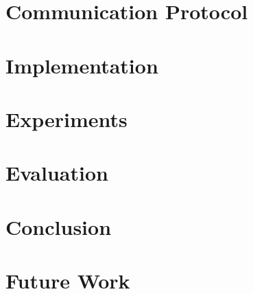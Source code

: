 \documentclass[
	paper=a4,
	fontsize=11pt,
	parskip=full %
]{scrreprt}
\begin{document}
    \chapter{Communication Protocol}\label{ch:protocol}
    

    \chapter{Implementation}\label{ch:implementation}
    

    \chapter{Experiments}\label{ch:experiments}
    

    \chapter{Evaluation}\label{ch:evaluation}
    

    \chapter{Conclusion}\label{ch:conclusion}
    

    \chapter{Future Work}\label{ch:futurework}
    
\end{document}
